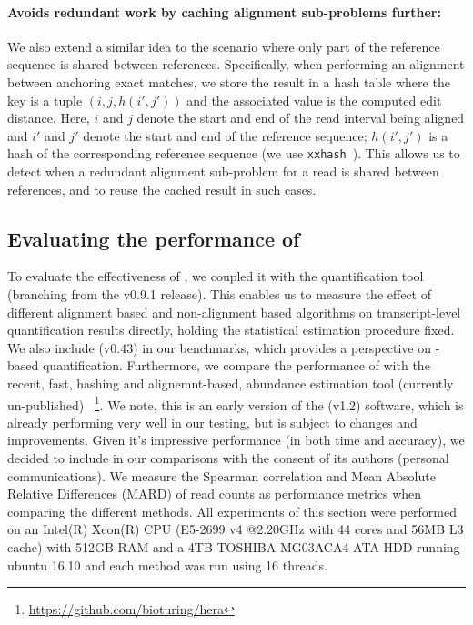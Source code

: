 \paragraph{Avoids redundant work by caching alignment sub-problems further:} We also extend a similar idea to the 
scenario where only part of the reference sequence is shared between references.  Specifically, when performing an 
alignment between anchoring exact matches, we store the result in a hash table where the key is a tuple 
$\left(i,j,h\left(i', j'\right)\right)$ and the associated value is the computed edit distance.  Here, $i$ 
and $j$ denote the start and end of the read interval being aligned and $i'$ and $j'$ denote the start and 
end of the reference sequence; $h(i',j')$ is a hash of the corresponding reference sequence 
(we use \texttt{xxhash}~\citep{xxhash}).  This allows us to detect when a redundant alignment sub-problem for 
a read is shared between references, and to reuse the cached result in such cases.


\subsection{Evaluating the performance of \sla}


To evaluate the effectiveness of \sla, we coupled it with the quantification tool \salmon (branching from the v0.9.1 
release). This enables us to measure the effect of different alignment based and non-alignment based algorithms on 
transcript-level quantification results directly, holding the statistical estimation procedure fixed. We also include 
\kallisto(v0.43) in our benchmarks, which provides a perspective on \pa-based quantification. Furthermore, we compare 
the performance of \sla with the recent, fast, hashing and alignemnt-based, abundance estimation tool (currently un-published) 
\hera~\footnote{\url{https://github.com/bioturing/hera}}. We note, this is an early version of the \hera(v1.2) software, 
which is already performing very well in our testing, but is subject to changes and improvements. Given it's impressive 
performance (in both time and accuracy), we decided to include \hera in our comparisons with the consent of its authors 
(personal communications). We measure the Spearman correlation and Mean Absolute Relative Differences (MARD) of read 
counts as performance metrics when comparing the different methods.
All experiments of this section were performed on an Intel(R) Xeon(R) CPU (E5-2699 v4 @2.20GHz 
with 44 cores and 56MB L3 cache) with 512GB RAM and a 4TB TOSHIBA MG03ACA4 ATA HDD running ubuntu 16.10 and each method 
was run using 16 threads.

